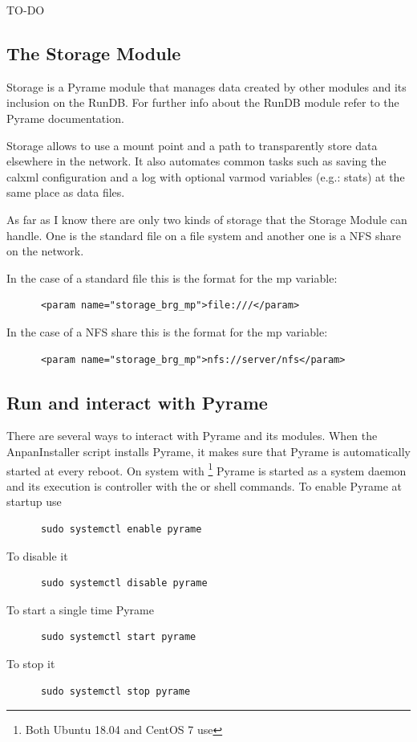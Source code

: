 TO-DO

\subsection{The Storage Module}
\label{sec:STORAGE}

Storage is a Pyrame module that manages data created by other modules
and its inclusion on the RunDB. For further info about the RunDB
module refer to the Pyrame documentation.

Storage allows to use a mount point and a path to transparently store
data elsewhere in the network. It also automates common tasks such as
saving the calxml configuration and a log with optional varmod
variables (e.g.: stats) at the same place as data files.

As far as I know there are only two kinds of storage that the Storage
Module can handle. One is the standard file on a file system and
another one is a NFS share on the network.

In the case of a standard file this is the format for the mp variable:
\begin{lstlisting}
      <param name="storage_brg_mp">file:///</param>
\end{lstlisting}
In the case of a NFS share this is the format for the mp variable:
\begin{lstlisting}
      <param name="storage_brg_mp">nfs://server/nfs</param>
\end{lstlisting}


\subsection{Run and interact with Pyrame}
There are several ways to interact with Pyrame and its modules. When
the AnpanInstaller script installs Pyrame, it makes sure that Pyrame
is automatically started at every reboot. On system with
\footnote{Both Ubuntu 18.04 and CentOS 7 use
  } Pyrame is started as a system daemon and its
execution is controller with the  or
 shell commands. To enable Pyrame at startup use
\begin{lstlisting}
      sudo systemctl enable pyrame
\end{lstlisting}
To disable it
\begin{lstlisting}
      sudo systemctl disable pyrame
\end{lstlisting}
To start a single time Pyrame
\begin{lstlisting}
      sudo systemctl start pyrame
\end{lstlisting}
To stop it
\begin{lstlisting}
      sudo systemctl stop pyrame
\end{lstlisting}

